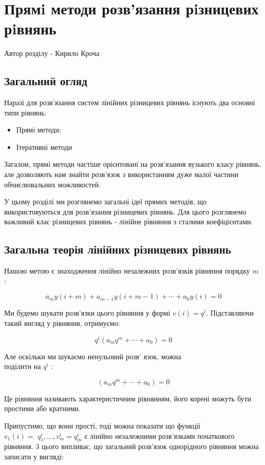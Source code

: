 \chapter{Прямi методи розв’язання рiзницевих
рiвнянь}

Автор розділу - Кирило Кроча

\section{Загальний огляд}

Наразі для розв'язання систем лінійних різницевих рівнянь існують два основні типи рівнянь:
\begin{itemize}
    \item Прямі методи;
    \item Ітеративні методи
\end{itemize}    


Загалом, прямі методи частіше орієнтовані на розв'язання вузького класу рівнянь, але дозволяють нам знайти розв'язок з використанням дуже малої частини обчислювальних можливостей.

У цьому розділі ми розглянемо загальні ідеї прямих методів, що використовуються для розв'язання різницевих рівнянь. Для цього розглянемо важливий клас різницевих рівнянь - лінійне рівняння з сталими коефіцієнтами.

\section{Загальна теорія лінійних різницевих рівнянь}

Нашою метою є знаходження лінійно незалежних розв'язків рівняння порядку $m$ :

$$
a_{m} y(i+m)+a_{m-1} y(i+m-1)+\cdots+a_{0} y(i)=0
$$

Ми будемо шукати розв'язки цього рівняння у формі $v(i)=q^{i}$. Підставляючи такий вигляд у рівняння, отримуємо:

$$
q^{i}\left(a_{m} q^{m}+\cdots+a_{0}\right)=0
$$

Але оскільки ми шукаємо ненульовий розв' язок, можна \\поділити на $q^{i}$ :

$$
\left(a_{m} q^{m}+\cdots+a_{0}\right)=0
$$

Це рівняння називають характеристичним рівнянням, його корені можуть бути простими або кратними.

Припустимо, що вони прості, тоді можна показати що функції \\ $v_{1}(i)=$ $q_{1}^{i}, \ldots, v_{m}^{i}=q_{m}^{i}$ є лінійно незалежними розв'язками початкового рівняння. 3 цього випливає, що загальний розв'язок однорідного рівняння можна записати у вигляді:

